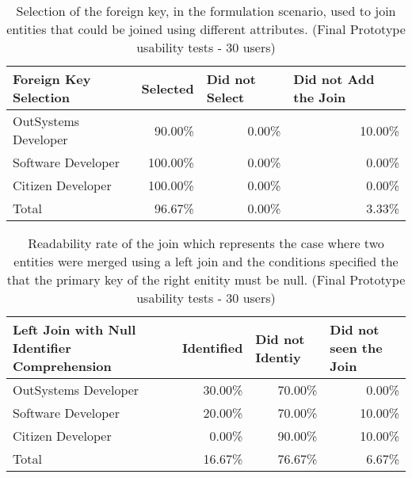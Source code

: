 \begin{table}[tb]
  \caption{Selection of the foreign key, in the formulation scenario, used to join entities that could be joined using different attributes. (Final Prototype usability tests - 30 users)}
    \label{tab:finalPrototypeForeignKeySelection}
  \begin{tabular}{@{}lrrr@{}}
  \toprule
  \textbf{Foreign Key Selection} & \multicolumn{1}{l}{Selected} & \multicolumn{1}{l}{Did not Select} & \multicolumn{1}{l}{Did not Add the Join} \\ \midrule
  OutSystems Developer           & 90.00\%                      & 0.00\%                             & 10.00\%                                  \\
  Software Developer             & 100.00\%                     & 0.00\%                             & 0.00\%                                   \\
  Citizen Developer              & 100.00\%                     & 0.00\%                             & 0.00\%                                   \\
  Total                          & 96.67\%                      & 0.00\%                             & 3.33\%                                   \\ \bottomrule
  \end{tabular}
  \end{table}

\begin{table}[tb]
  \caption{Readability rate of the join which represents the case where two entities were merged using a left join and the conditions specified the that the primary key of the right enitity must be null. (Final Prototype usability tests - 30 users)}
    \label{tab:finalPrototypeLeftJoinNull}
  \begin{tabular}{@{}m{5.4cm}rrr@{}}
  \toprule
  \textbf{Left Join with Null Identifier Comprehension} & \multicolumn{1}{l}{Identified} & \multicolumn{1}{l}{Did not Identiy} & \multicolumn{1}{l}{Did not seen the Join} \\ \midrule
  OutSystems Developer                                  & 30.00\%                        & 70.00\%                                & 0.00\%                                    \\
  Software Developer                                    & 20.00\%                        & 70.00\%                                & 10.00\%                                   \\
  Citizen Developer                                     & 0.00\%                         & 90.00\%                                & 10.00\%                                   \\
  Total                                                 & 16.67\%                        & 76.67\%                                & 6.67\%                                    \\ \bottomrule
  \end{tabular}
  \end{table}


